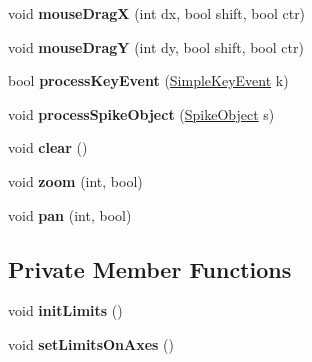 \begin{DoxyCompactItemize}
\item 
\hypertarget{classStereotrodePlot_aa815cd74cd2e69bd38aea6652292b9cc}{void {\bfseries mouse\-Drag\-X} (int dx, bool shift, bool ctr)}\label{classStereotrodePlot_aa815cd74cd2e69bd38aea6652292b9cc}

\item 
\hypertarget{classStereotrodePlot_ae7617aa26fbbcbe15ed801a27730976d}{void {\bfseries mouse\-Drag\-Y} (int dy, bool shift, bool ctr)}\label{classStereotrodePlot_ae7617aa26fbbcbe15ed801a27730976d}

\item 
\hypertarget{classStereotrodePlot_affd802a81737b9014b09d796ae373942}{bool {\bfseries process\-Key\-Event} (\hyperlink{structSimpleKeyEvent}{Simple\-Key\-Event} k)}\label{classStereotrodePlot_affd802a81737b9014b09d796ae373942}

\item 
\hypertarget{classStereotrodePlot_a9d197c94a09087ec058724e1b1854017}{void {\bfseries process\-Spike\-Object} (\hyperlink{structSpikeObject}{Spike\-Object} s)}\label{classStereotrodePlot_a9d197c94a09087ec058724e1b1854017}

\item 
\hypertarget{classStereotrodePlot_a59d2e1d5dc55ca25b34fc0da30187707}{void {\bfseries clear} ()}\label{classStereotrodePlot_a59d2e1d5dc55ca25b34fc0da30187707}

\item 
\hypertarget{classStereotrodePlot_a57903b22d7be7c20d26b1ca996a6e192}{void {\bfseries zoom} (int, bool)}\label{classStereotrodePlot_a57903b22d7be7c20d26b1ca996a6e192}

\item 
\hypertarget{classStereotrodePlot_ac9a104b9bed4aa493e2a65a68e67a600}{void {\bfseries pan} (int, bool)}\label{classStereotrodePlot_ac9a104b9bed4aa493e2a65a68e67a600}

\end{DoxyCompactItemize}
\subsection*{Private Member Functions}
\begin{DoxyCompactItemize}
\item 
\hypertarget{classStereotrodePlot_a75dd01ab7ba238a744a0b137bbf78002}{void {\bfseries init\-Limits} ()}\label{classStereotrodePlot_a75dd01ab7ba238a744a0b137bbf78002}

\item 
\hypertarget{classStereotrodePlot_a28b4fccd31b9adbf449449a8ead1e2a3}{void {\bfseries set\-Limits\-On\-Axes} ()}\label{classStereotrodePlot_a28b4fccd31b9adbf449449a8ead1e2a3}

\end{DoxyCompactItemize}

